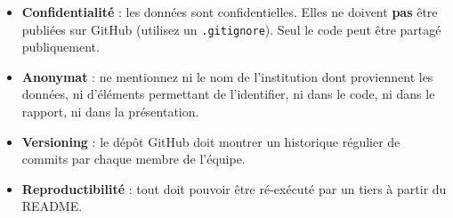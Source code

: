 \documentclass[11pt,a4paper]{article}
\providecommand{\tightlist}{\setlength{\itemsep}{0pt}\setlength{\parskip}{0pt}}
\begin{document}
\begin{itemize}
\tightlist
\item
  \textbf{Confidentialité} : les données sont confidentielles. Elles ne
  doivent \textbf{pas} être publiées sur GitHub (utilisez un
  \texttt{.gitignore}). Seul le code peut être partagé publiquement.
\item
  \textbf{Anonymat} : ne mentionnez ni le nom de l'institution dont
  proviennent les données, ni d'éléments permettant de l'identifier, ni
  dans le code, ni dans le rapport, ni dans la présentation.
\item
  \textbf{Versioning} : le dépôt GitHub doit montrer un historique
  régulier de commits par chaque membre de l'équipe.
\item
  \textbf{Reproductibilité} : tout doit pouvoir être ré-exécuté par un
  tiers à partir du README.
\end{itemize}
\end{document}
